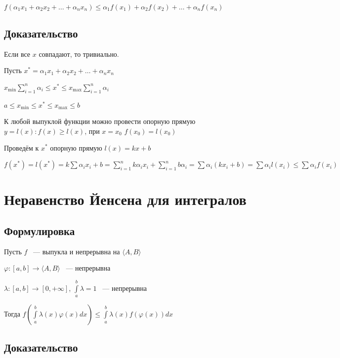 \documentclass{article}
\begin{document}
            $f(\alpha_1 x_1 + \alpha_2 x_2 + \ldots + \alpha_n x_n) \leq \alpha_1 f(x_1) + \alpha_2 f(x_2) + \ldots + \alpha_n f(x_n)$
            
        \subsection{Доказательство}
        
            Если все $x$ совпадают, то тривиально.
            
            Пусть $x^* = \alpha_1 x_1 + \alpha_2 x_2 + \ldots + \alpha_n x_n$
            
            $x_{\min} \sum\limits_{i = 1}^n \alpha_i \leq x^* \leq x_{\max} \sum\limits_{i = 1}^n \alpha_i$
            
            $a \leq x_{\min} \leq x^* \leq x_{\max} \leq b$
            
            К любой выпуклой функции можно провести опорную прямую $y = l(x) : f(x) \geq l(x)$, при $x = x_0$ $f(x_0) = l(x_0)$
            
            Проведём к $x^*$ опорную прямую $l(x) = kx + b$
            
            $f(x^*) = l(x^*) = k \sum \alpha_i  x_i + b = \sum\limits_{i = 1}^n k \alpha_i x_i + \sum\limits_{i = 1}^n b \alpha_i = \sum \alpha_i (k x_i + b) = \sum \alpha_i l(x_i) \leq \sum \alpha_i f(x_i)$
            
    \newpage
    
    \section{Неравенство Йенсена для интегралов}
    
        \subsection{Формулировка}
        
            Пусть $f$ ~--- выпукла и непрерывна на $\langle A, B \rangle$
            
            $\varphi : [a, b] \rightarrow \langle A, B \rangle$ ~--- непрерывна
            
            $\lambda : [a, b] \rightarrow [0, +\infty]$, $\int\limits^b_a \lambda = 1$ ~--- непрерывна
            
            Тогда $f\left( \int\limits^b_a \lambda(x) \varphi(x) dx \right) \leq \int\limits^b_a \lambda(x) f(\varphi(x)) dx$
        \subsection{Доказательство}
        
\end{document}
